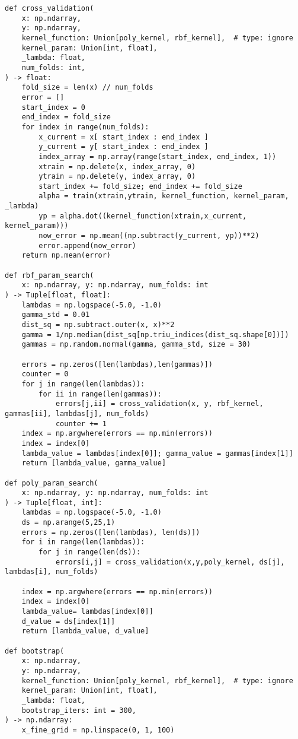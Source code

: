 \documentclass{article}
\begin{document}
\begin{aprob}
\begin{enumerate}
\begin{lstlisting}
def cross_validation(
    x: np.ndarray,
    y: np.ndarray,
    kernel_function: Union[poly_kernel, rbf_kernel],  # type: ignore
    kernel_param: Union[int, float],
    _lambda: float,
    num_folds: int,
) -> float:
    fold_size = len(x) // num_folds
    error = []
    start_index = 0
    end_index = fold_size
    for index in range(num_folds):
        x_current = x[ start_index : end_index ]
        y_current = y[ start_index : end_index ]
        index_array = np.array(range(start_index, end_index, 1))
        xtrain = np.delete(x, index_array, 0)
        ytrain = np.delete(y, index_array, 0)
        start_index += fold_size; end_index += fold_size
        alpha = train(xtrain,ytrain, kernel_function, kernel_param, _lambda)
        yp = alpha.dot((kernel_function(xtrain,x_current, kernel_param)))
        now_error = np.mean((np.subtract(y_current, yp))**2)
        error.append(now_error)
    return np.mean(error)

def rbf_param_search(
    x: np.ndarray, y: np.ndarray, num_folds: int
) -> Tuple[float, float]:
    lambdas = np.logspace(-5.0, -1.0)
    gamma_std = 0.01
    dist_sq = np.subtract.outer(x, x)**2
    gamma = 1/np.median(dist_sq[np.triu_indices(dist_sq.shape[0])])
    gammas = np.random.normal(gamma, gamma_std, size = 30)

    errors = np.zeros([len(lambdas),len(gammas)])
    counter = 0
    for j in range(len(lambdas)):
        for ii in range(len(gammas)):
            errors[j,ii] = cross_validation(x, y, rbf_kernel, gammas[ii], lambdas[j], num_folds)
            counter += 1
    index = np.argwhere(errors == np.min(errors))
    index = index[0]
    lambda_value = lambdas[index[0]]; gamma_value = gammas[index[1]]
    return [lambda_value, gamma_value]

def poly_param_search(
    x: np.ndarray, y: np.ndarray, num_folds: int
) -> Tuple[float, int]:
    lambdas = np.logspace(-5.0, -1.0)
    ds = np.arange(5,25,1)
    errors = np.zeros([len(lambdas), len(ds)])
    for i in range(len(lambdas)):
        for j in range(len(ds)):
            errors[i,j] = cross_validation(x,y,poly_kernel, ds[j], lambdas[i], num_folds)
    
    index = np.argwhere(errors == np.min(errors))
    index = index[0]
    lambda_value= lambdas[index[0]]
    d_value = ds[index[1]]
    return [lambda_value, d_value]

def bootstrap(
    x: np.ndarray,
    y: np.ndarray,
    kernel_function: Union[poly_kernel, rbf_kernel],  # type: ignore
    kernel_param: Union[int, float],
    _lambda: float,
    bootstrap_iters: int = 300,
) -> np.ndarray:
    x_fine_grid = np.linspace(0, 1, 100)


\end{lstlisting}
\end{enumerate}
\end{aprob}
\end{document}
